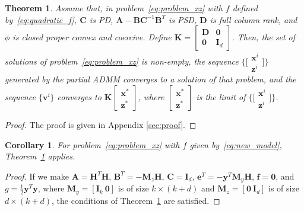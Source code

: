 \documentclass[10pt,twocolumn,twoside]{IEEEtran}
\newcommand{\Hm}{\mathbf{H}} %
\newcommand{\y}{\mathbf{y}} %
\newcommand{\x}{\mathbf{x}} %
\newcommand{\z}{\mathbf{z}} %
\newcommand{\vs}{\mathbf{v}} %
\newcommand{\D}{\mathbf{D}} %
\newcommand{\A}{\mathbf{A}} %
\newcommand{\B}{\mathbf{B}} %
\newcommand{\C}{\mathbf{C}} %
\newcommand{\e}{\mathbf{e}} %
\newcommand{\f}{\mathbf{f}} %
\newcommand{\M}{\mathbf{M}} %
\newcommand{\I}{\mathbf{I}} %
\newcommand{\K}{\mathbf{K}} %
\newtheorem{theorem}{Theorem}
\newtheorem{corollary}{Corollary}
\begin{document}
\begin{theorem} \label{th:main}
	Assume that, in problem~\eqref{eq:problem_xz} with $f$ defined by~\eqref{eq:quadratic_f}, $\C$ is PD, $\A - \B \C^{-1} \B^T$ is PSD, $\D$ is full column rank, and $\phi$ is closed proper convex and coercive. Define $\K = \left[\begin{smallmatrix} \D & \mathbf{0} \\ \mathbf{0} & \I_{d} \end{smallmatrix} \right]$. Then, the set of solutions of problem~\eqref{eq:problem_xz} is non-empty, the sequence $\big\{\big[\begin{smallmatrix} \x^i \\ \z^i \end{smallmatrix}\big]\big\}$ generated by the partial ADMM converges to a solution of that problem, and the sequence $\{\vs^i\}$ converges to $\K \left[\begin{smallmatrix} \x^* \\ \z^* \end{smallmatrix}\right]$, where $\left[\begin{smallmatrix} \x^* \\ \z^* \end{smallmatrix}\right]$ is the limit of $\big\{\big[\begin{smallmatrix} \x^i \\ \z^i \end{smallmatrix}\big]\big\}$.
\end{theorem}

\begin{proof}
The proof is given in Appendix \ref{sec:proof}.
\end{proof}

\begin{corollary} \label{th:corollary}
	For problem~\eqref{eq:problem_xz} with $f$ given by~\eqref{eq:new_model}, Theorem~\ref{th:main} applies.
\end{corollary}

\begin{proof}
	If we make $\A = \Hm^T \Hm$, $\B^T = - \M_z \Hm$, $\C = \I_d$, $\e^T = - \y^T \M_y \Hm$, $\f = \mathbf{0}$, and $g = \frac{1}{2} \y^T \y$, where $\M_y = [\I_k~\mathbf 0]$ is of size $k \times (k+d)$ and $\M_z = [\mathbf 0~\I_d]$ is of size $d \times (k+d)$, the conditions of Theorem~\ref{th:main} are satisfied.
\end{proof}
\end{document}
